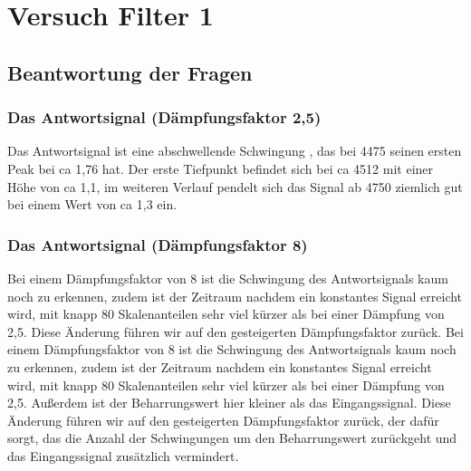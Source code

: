 




\maketitle



\tableofcontents

\newpage



\section{Versuch Filter 1}


\subsection{Beantwortung der Fragen}

\subsubsection*{Das Antwortsignal (Dämpfungsfaktor 2,5)}

Das Antwortsignal ist eine abschwellende Schwingung , das bei 4475 seinen ersten Peak bei ca 1,76 hat. Der erste Tiefpunkt befindet sich bei ca 4512 mit einer Höhe von ca 1,1, im weiteren Verlauf pendelt sich das Signal ab 4750 ziemlich gut bei einem Wert von ca 1,3 ein.


\subsubsection*{Das Antwortsignal (Dämpfungsfaktor 8)}

Bei einem Dämpfungsfaktor von 8 ist die Schwingung des Antwortsignals kaum noch zu erkennen, zudem ist der Zeitraum nachdem ein konstantes Signal erreicht wird, mit knapp 80 Skalenanteilen sehr viel kürzer als bei einer Dämpfung von 2,5. Diese Änderung führen wir auf den gesteigerten Dämpfungsfaktor zurück.
Bei einem Dämpfungsfaktor von 8 ist die Schwingung des Antwortsignals kaum noch zu erkennen, zudem ist der Zeitraum nachdem ein konstantes Signal erreicht wird, mit knapp 80 Skalenanteilen sehr viel kürzer als bei einer Dämpfung von 2,5. Außerdem ist der Beharrungswert hier kleiner als das Eingangssignal. Diese Änderung führen wir auf den gesteigerten Dämpfungsfaktor zurück, der dafür sorgt, das die Anzahl der Schwingungen um den Beharrungswert zurückgeht und das Eingangssignal zusätzlich vermindert.


